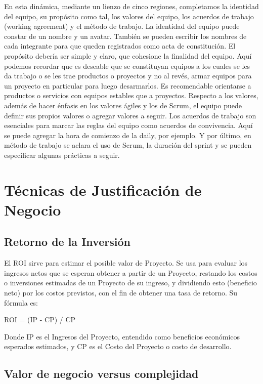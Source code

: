 En esta dinámica, mediante un lienzo de cinco regiones, completamos la identidad del equipo, su propósito como tal, los valores del equipo, los acuerdos de trabajo (working agreement) y el método de trabajo. La identidad del equipo puede constar de un nombre y un avatar. También se pueden escribir los nombres de cada integrante para que queden registrados como acta de constitución. El propósito debería ser simple y claro, que cohesione la finalidad del equipo. Aquí podemos recordar que es deseable que se constituyan equipos a los cuales se les da trabajo o se les trae productos o proyectos y no al revés, armar equipos para un proyecto en particular para luego desarmarlos. Es recomendable orientarse a productos o servicios con equipos estables que a proyectos. Respecto a los valores, además de hacer énfasis en los valores ágiles y los de Scrum, el equipo puede definir sus propios valores o agregar valores a seguir. Los acuerdos de trabajo son esenciales para marcar las reglas del equipo como acuerdos de convivencia. Aquí se puede agregar la hora de comienzo de la daily, por ejemplo. Y por último, en método de trabajo se aclara el uso de Scrum, la duración del sprint y se pueden especificar algunas prácticas a seguir.

\newpage
\section{Técnicas de Justificación de Negocio}

\subsection{Retorno de la Inversión}

El ROI sirve para estimar el posible valor de Proyecto. Se usa para evaluar los ingresos netos que se esperan obtener a partir de un Proyecto, restando los costos o inversiones estimadas de un Proyecto de su ingreso, y dividiendo esto (beneficio neto) por los costos previstos, con el fin de obtener una tasa de retorno. Su fórmula es:

ROI = (IP - CP) / CP

Donde IP es el Ingresos del Proyecto, entendido como beneficios económicos esperados estimados, y CP es el Costo del Proyecto o costo de desarrollo.

\subsection{Valor de negocio versus complejidad}

